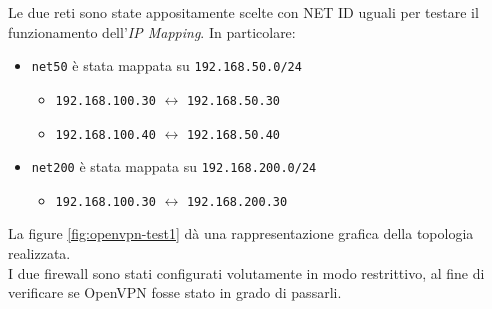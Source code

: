 Le due reti sono state appositamente scelte con NET ID uguali per testare il funzionamento
dell'\textit{IP Mapping}. In particolare:
\begin{itemize}
  \item \texttt{net50} è stata mappata su \texttt{192.168.50.0/24}
  \begin{itemize}
    \item \texttt{192.168.100.30} $\leftrightarrow$ \texttt{192.168.50.30}
    \item \texttt{192.168.100.40} $\leftrightarrow$ \texttt{192.168.50.40}
  \end{itemize}
  \item \texttt{net200} è stata mappata su \texttt{192.168.200.0/24}
  \begin{itemize}
    \item \texttt{192.168.100.30} $\leftrightarrow$ \texttt{192.168.200.30}
  \end{itemize}
\end{itemize}
La figure \ref{fig:openvpn-test1} dà una rappresentazione grafica della topologia
realizzata.\\
I due firewall sono stati configurati volutamente in modo restrittivo, al fine
di verificare se OpenVPN fosse stato in grado di passarli.





